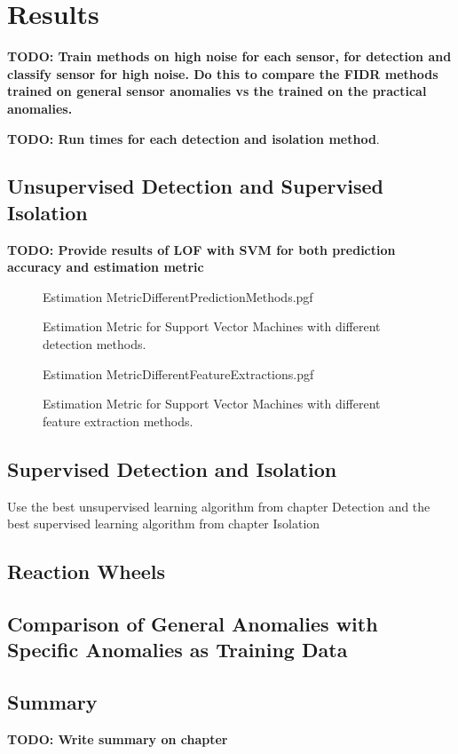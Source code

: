 \chapter{Results}
\label{chap:Results}

\textbf{TODO: Train methods on high noise for each sensor, for detection and classify sensor for high noise. Do this to compare the FIDR methods trained on general sensor anomalies vs the trained on the practical anomalies.}

\textbf{TODO: Run times for each detection and isolation method}.

\section{Unsupervised Detection and Supervised Isolation}
\textbf{TODO: Provide results of LOF with SVM for both prediction accuracy and estimation metric}

\begin{figure}[!htb]
	\centering
	{Estimation MetricDifferentPredictionMethods.pgf}
	
	\caption{Estimation Metric for Support Vector Machines with different detection methods.}
	\label{fig:SVMCompareDetectionMethods}
\end{figure}

\begin{figure}[!htb]
	\centering
	{Estimation MetricDifferentFeatureExtractions.pgf}
	
	\caption{Estimation Metric for Support Vector Machines with different feature extraction methods.}
	\label{fig:SVMCompareFeatureExtractions}
\end{figure}

\section{Supervised Detection and Isolation}
Use the best unsupervised learning algorithm from chapter Detection and the best supervised learning algorithm from chapter Isolation

\section{Reaction Wheels}

\section{Comparison of General Anomalies with Specific Anomalies as Training Data}

\section{Summary}
\textbf{TODO: Write summary on chapter}